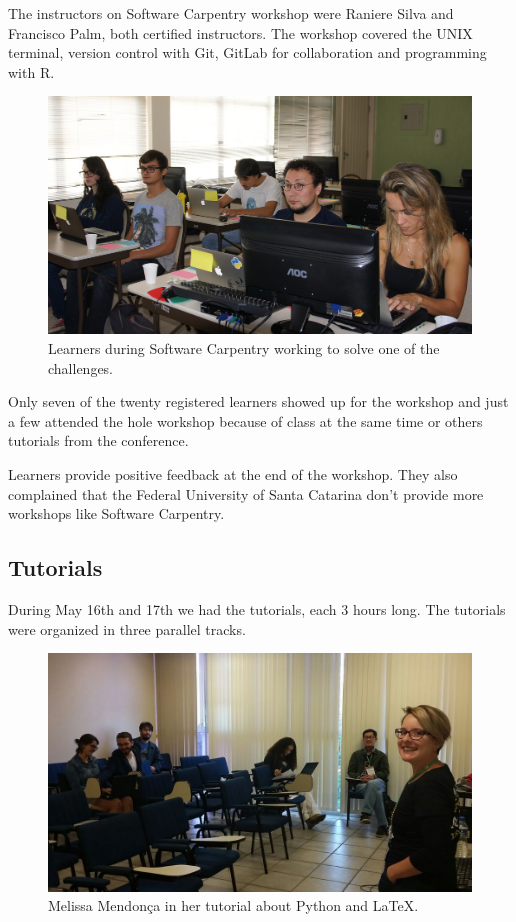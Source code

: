 \documentclass[12pt]{article}
\begin{document}
The instructors on Software Carpentry workshop were Raniere Silva and Francisco
Palm, both certified instructors.
The workshop covered the UNIX terminal, version control with Git,
GitLab for collaboration and programming with R.

\begin{figure}[!htb]
\center
\includegraphics[height=.3\textheight]{swc-students.jpg}
\caption{Learners during Software Carpentry working to solve one of the
challenges.}
\end{figure}

Only seven of the twenty registered learners showed up for the workshop
and just a few attended the hole workshop because of class at the same time
or others tutorials from the conference.

Learners provide positive feedback at the end of the workshop.
They also complained that the Federal University of Santa Catarina
don't provide more workshops like Software Carpentry.

\subsection*{Tutorials}

During May 16th and 17th we had the tutorials, each 3 hours long.
The tutorials were organized in three parallel tracks.

\begin{figure}[!htb]
\center
\includegraphics[height=.3\textheight]{tutorial-latex.jpg}
\caption{Melissa Mendonça in her tutorial about Python and LaTeX.}
\end{figure}
\end{document}
